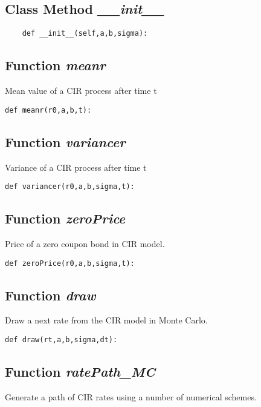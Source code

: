 \documentclass[twoside,11pt]{book}
\begin{document}
\subsection{Class Method {\it \_\_init\_\_}}


\begin{lstlisting}
    def __init__(self,a,b,sigma):
\end{lstlisting}

\subsection{Function {\it meanr}}
Mean value of a CIR process after time t 

\begin{lstlisting}
def meanr(r0,a,b,t):
\end{lstlisting}

\subsection{Function {\it variancer}}
Variance of a CIR process after time t 

\begin{lstlisting}
def variancer(r0,a,b,sigma,t):
\end{lstlisting}

\subsection{Function {\it zeroPrice}}
Price of a zero coupon bond in CIR model. 

\begin{lstlisting}
def zeroPrice(r0,a,b,sigma,t):
\end{lstlisting}

\subsection{Function {\it draw}}
Draw a next rate from the CIR model in Monte Carlo. 

\begin{lstlisting}
def draw(rt,a,b,sigma,dt):
\end{lstlisting}

\subsection{Function {\it ratePath\_MC}}
Generate a path of CIR rates using a number of numerical schemes. 
\end{document}
